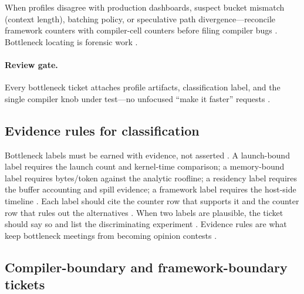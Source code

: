 When profiles disagree with production dashboards, suspect bucket mismatch (context length), batching policy, or speculative path divergence---reconcile framework counters with compiler-cell counters before filing compiler bugs \citep{kwon2023vllm,patel2025llminference,taxbreak2026,memoryfloor2026,yirage2026,chen2020compilerbasedhardw,liu2024deepseekv3,amd2024aie,dlbook,semianalysis2024tma,amd2024xdna,dao2022flashattention,dao2023flashdecoding,nvidia2024cudagraphs,nvidia2022hopper}. Bottleneck locating is forensic work \citep{patel2025llminference,yirage2026,chen2020compilerbasedhardw,memoryfloor2026,taxbreak2026,amd2024aie,dlbook,kwon2023vllm,liu2024deepseekv3,semianalysis2024tma,amd2024xdna,dao2022flashattention,dao2023flashdecoding,nvidia2024cudagraphs,nvidia2022hopper}.

\paragraph{Review gate.} Every bottleneck ticket attaches profile artifacts, classification label, and the single compiler knob under test---no unfocused ``make it faster'' requests \citep{patel2025llminference,yirage2026,memoryfloor2026,chen2020compilerbasedhardw}.

\subsection{Evidence rules for classification}

Bottleneck labels must be earned with evidence, not asserted \citep{patel2025llminference,memoryfloor2026,taxbreak2026}. A launch-bound label requires the launch count and kernel-time comparison; a memory-bound label requires bytes/token against the analytic roofline; a residency label requires the buffer accounting and spill evidence; a framework label requires the host-side timeline \citep{nvidia2024cudagraphs,dao2022flashattention,chen2020compilerbasedhardw}. Each label should cite the counter row that supports it and the counter row that rules out the alternatives \citep{memoryfloor2026,patel2025llminference}. When two labels are plausible, the ticket should say so and list the discriminating experiment \citep{chen2020compilerbasedhardw,taxbreak2026}. Evidence rules are what keep bottleneck meetings from becoming opinion contests \citep{patel2025llminference,memoryfloor2026}.

\subsection{Compiler-boundary and framework-boundary tickets}

